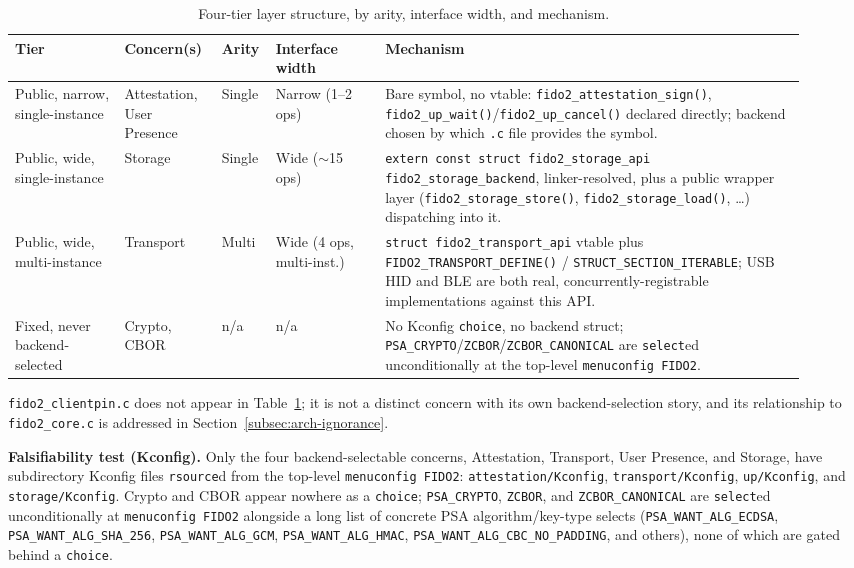\begin{table}[t]
\centering
\caption{Four-tier layer structure, by arity, interface width, and mechanism.}
\label{tab:fourtier}
\small
\begin{tabular}{@{}p{0.13\linewidth} p{0.11\linewidth} p{0.05\linewidth} p{0.13\linewidth} p{0.50\linewidth}@{}}
\toprule
\textbf{Tier} & \textbf{Concern(s)} & \textbf{Arity} & \textbf{Interface width} & \textbf{Mechanism} \\
\midrule
Public, narrow, single-instance & Attestation, User Presence & Single & Narrow (1--2 ops) & Bare symbol, no vtable: \texttt{fido2\_attestation\_sign()}, \texttt{fido2\_up\_wait()}/\texttt{fido2\_up\_cancel()} declared directly; backend chosen by which \texttt{.c} file provides the symbol. \\
\addlinespace
Public, wide, single-instance & Storage & Single & Wide ($\sim$15 ops) & \texttt{extern const struct fido2\_storage\_api fido2\_storage\_backend}, linker-resolved, plus a public wrapper layer (\texttt{fido2\_storage\_store()}, \texttt{fido2\_storage\_load()}, \ldots) dispatching into it. \\
\addlinespace
Public, wide, multi-instance & Transport & Multi & Wide (4 ops, multi-inst.) & \texttt{struct fido2\_transport\_api} vtable plus \texttt{FIDO2\_TRANSPORT\_DEFINE()} / \texttt{STRUCT\_SECTION\_ITERABLE}; USB HID and BLE are both real, concurrently-registrable implementations against this API. \\
\addlinespace
Fixed, never backend-selected & Crypto, CBOR & n/a & n/a & No Kconfig \texttt{choice}, no backend struct; \texttt{PSA\_CRYPTO}/\texttt{ZCBOR}/\texttt{ZCBOR\_CANONICAL} are \texttt{select}ed unconditionally at the top-level \texttt{menuconfig FIDO2}. \\
\bottomrule
\end{tabular}
\end{table}

\texttt{fido2\_clientpin.c} does not appear in Table~\ref{tab:fourtier}; it is not a distinct concern with its own backend-selection story, and its relationship to \texttt{fido2\_core.c} is addressed in Section~\ref{subsec:arch-ignorance}.

\textbf{Falsifiability test (Kconfig).} Only the four backend-selectable concerns, Attestation, Transport, User Presence, and Storage, have subdirectory Kconfig files \texttt{rsource}d from the top-level \texttt{menuconfig FIDO2}: \texttt{attestation/Kconfig}, \texttt{transport/Kconfig}, \texttt{up/Kconfig}, and \texttt{storage/Kconfig}. Crypto and CBOR appear nowhere as a \texttt{choice}; \texttt{PSA\_CRYPTO}, \texttt{ZCBOR}, and \texttt{ZCBOR\_CANONICAL} are \texttt{select}ed unconditionally at \texttt{menuconfig FIDO2} alongside a long list of concrete PSA algorithm/key-type selects (\texttt{PSA\_WANT\_ALG\_ECDSA}, \texttt{PSA\_WANT\_ALG\_SHA\_256}, \texttt{PSA\_WANT\_ALG\_GCM}, \texttt{PSA\_WANT\_ALG\_HMAC}, \texttt{PSA\_WANT\_ALG\_CBC\_NO\_PADDING}, and others), none of which are gated behind a \texttt{choice}.

